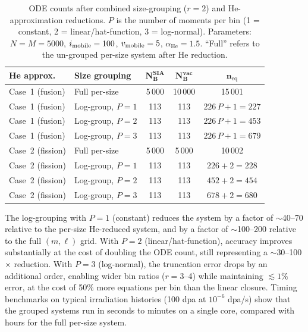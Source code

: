 \documentclass[pdflatex,sn-basic]{sn-jnl} %
\begin{document}
\begin{table}[htbp]
\centering
\caption{ODE counts after combined size-grouping ($r = 2$) and
He-approximation reductions. $P$ is the number of moments per bin
(1 = constant, 2 = linear/hat-function, 3 = log-normal). Parameters:
$N = M = 5000$, $i_{\rm mobile} = 100$, $v_{\rm mobile} = 5$,
$\alpha_{\mathrm{He}} = 1.5$. ``Full'' refers to the un-grouped
per-size system after He reduction.}
\label{tab:reduced_size}
\renewcommand{\arraystretch}{1.25}
\begin{tabular}{@{}llccc@{}}
\toprule
\textbf{He approx.} & \textbf{Size grouping}
  & $\mathbf{N_B^{SIA}}$
  & $\mathbf{N_B^{vac}}$
  & $\mathbf{n_{\mathrm{eq}}}$ \\
\midrule
Case~1 (fusion) & Full per-size
  & 5\,000 & 10\,000 & 15\,001 \\
Case~1 (fusion) & Log-group, $P=1$
  & 113 & 113 & $226\,P + 1 = 227$ \\
Case~1 (fusion) & Log-group, $P=2$
  & 113 & 113 & $226\,P + 1 = 453$ \\
Case~1 (fusion) & Log-group, $P=3$
  & 113 & 113 & $226\,P + 1 = 679$ \\
Case~2 (fission) & Full per-size
  & 5\,000 & 5\,000 & 10\,002 \\
Case~2 (fission) & Log-group, $P=1$
  & 113 & 113 & $226 + 2 = 228$ \\
Case~2 (fission) & Log-group, $P=2$
  & 113 & 113 & $452 + 2 = 454$ \\
Case~2 (fission) & Log-group, $P=3$
  & 113 & 113 & $678 + 2 = 680$ \\
\bottomrule
\end{tabular}
\end{table}

\noindent
The log-grouping with $P=1$ (constant) reduces the system by a factor of
$\sim$40--70 relative to the per-size He-reduced system, and by a
factor of $\sim$100--200 relative to the full $(m,\ell)$ grid. With
$P=2$ (linear/hat-function), accuracy improves substantially at the cost of
doubling the ODE count, still representing a $\sim$30--100$\times$
reduction. With $P=3$ (log-normal), the truncation error drops by an additional
order, enabling wider bin ratios ($r = 3$--4) while maintaining $\lesssim 1\%$
error, at the cost of 50\% more equations per bin than the linear closure.
Timing benchmarks on typical irradiation histories
(100 dpa at $10^{-6}$ dpa/s) show that the grouped systems run in
seconds to minutes on a single core, compared with hours for the
full per-size system.
\end{document}
